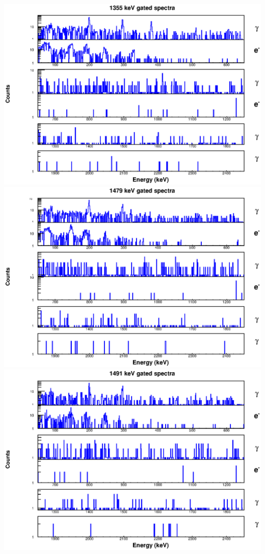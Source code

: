 \includegraphics[scale=0.8]{156Gd_Appendix/1355_combined.eps}
\includegraphics[scale=0.8]{156Gd_Appendix/1479_combined.eps}
\includegraphics[scale=0.8]{156Gd_Appendix/1491_combined.eps}
